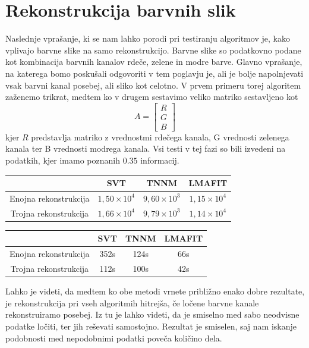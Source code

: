 \section{Rekonstrukcija barvnih slik}
Naslednje vprašanje, ki se nam lahko porodi pri testiranju algoritmov je, kako vplivajo barvne slike na samo rekonstrukcijo. Barvne slike so podatkovno podane kot kombinacija barvnih kanalov rdeče, zelene in modre barve. Glavno vprašanje, na katerega bomo poskušali odgovoriti v tem poglavju je, ali je bolje napolnjevati vsak barvni kanal posebej, ali sliko kot celotno. V prvem primeru torej algoritem zaženemo trikrat, medtem ko v drugem sestavimo veliko matriko sestavljeno kot 
\[
    A = \begin{bmatrix}
        R\\G\\B
    \end{bmatrix} 
\] 
kjer $R$ predstavlja matriko z vrednostmi rdečega kanala, G vrednosti zelenega kanala ter B vrednosti modrega kanala.
Vsi testi v tej fazi so bili izvedeni na podatkih, kjer imamo poznanih $0.35$ informacij.
\begin{table}[h]
    \centering
    \begin{tabular}{|c|c|c|c|}
    \hline
    & SVT & TNNM & LMAFIT \\
    \hline
    Enojna rekonstrukcija & $1,50 \times 10^4$ & $9,60\times 10^3$ & $1,15\times 10^4$ \\
    Trojna rekonstrukcija & $1,66\times 10^4$ & $9,79\times 10^3$ & $1,14\times 10^4$ \\
    \hline
    \end{tabular}
\end{table}

\begin{table}[h]
    \centering
    \begin{tabular}{|c|c|c|c|}
    \hline
    & SVT & TNNM & LMAFIT \\
    \hline
    Enojna rekonstrukcija & 352s & 124s & 66s \\
    Trojna rekonstrukcija & 112s & 100s & 42s \\
    \hline
    \end{tabular}
\end{table}
Lahko je videti, da medtem ko obe metodi vrnete približno enako dobre rezultate, je rekonstrukcija pri vseh algoritmih hitrejša, če ločene barvne kanale rekonstruiramo posebej. Iz tu je lahko videti, da je smiselno med sabo neodvisne podatke ločiti, ter jih reševati samostojno. Rezultat je smiselen, saj nam iskanje podobnosti med nepodobnimi podatki poveča količino dela. 

